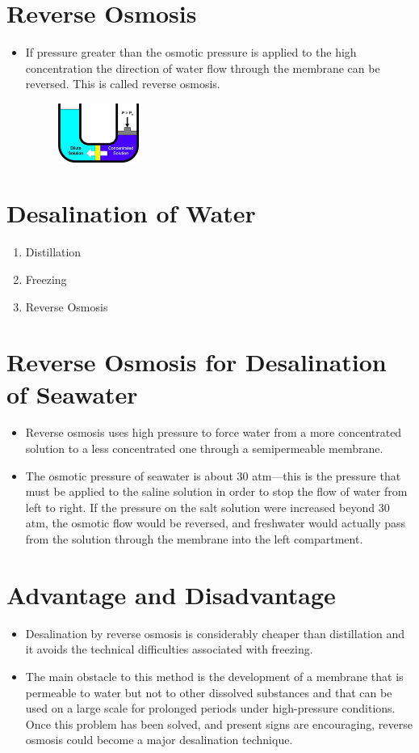 \documentclass[a4paper,12pt,twocolumn]{article}
\begin{document}
\section{Reverse Osmosis}
\begin{itemize}
\item If pressure greater than the osmotic pressure is applied to the high concentration the direction of water flow through the membrane can be reversed. This is called reverse osmosis. 
\begin{figure}[h]
\centering
\includegraphics[width=0.25\textwidth, keepaspectratio]{reverse3.jpg}
\end{figure}

\end{itemize}
\section{Desalination of Water}
\begin{enumerate}
\item Distillation
\item Freezing
\item Reverse Osmosis
\end{enumerate}
\section{Reverse Osmosis for Desalination of Seawater}
\begin{itemize}
\item Reverse osmosis uses high pressure to force water from a more concentrated solution to a less concentrated one through a semipermeable membrane. 
\item The osmotic pressure of seawater is about 30 atm—this is the pressure that must be applied to the saline solution in order to stop the flow of water from left to right. If the pressure on the salt solution were increased beyond 30 atm, the osmotic flow would be reversed, and freshwater would actually pass from the solution through the membrane into the left compartment. 

\end{itemize}
\section{Advantage and Disadvantage}
\begin{itemize}
\item Desalination by reverse osmosis is considerably cheaper than distillation and it avoids the technical difficulties associated with freezing. 
\item The main obstacle to this method is the development of a membrane  that is permeable to water but not to other dissolved substances and that can be used on a large scale for prolonged periods under high-pressure conditions. Once this problem has been solved, and present signs are encouraging, reverse osmosis could become a major desalination technique.
\end{itemize}
\end{document}
